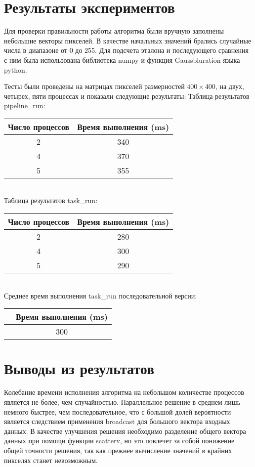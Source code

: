 \documentclass[a4paper,14pt]{report}
\begin{document}
\section{Результаты экспериментов}
Для проверки правильности работы алгоритма были вручную заполнены небольшие векторы пикселей. В качестве начальных значений брались случайные числа в диапазоне от 0 до 255. Для подсчета эталона и последующего сравнения с ним была использована библиотека numpy и функция Gaussbluration языка python. 

Тесты были проведены на матрицах пикселей размерностей $400 \times 400$, на двух, четырех, пяти процессах и показали следующие результаты:
Таблица результатов pipeline\_run:\\[0,5cm]
\begin{tabular}{|c|c|}
    \hline
    Число процессов   & Время выполнения (ms)  \\ \hline
    2               & 340                   \\ \hline
    4                &370                   \\ \hline
    5                &355                      \\ \hline
\end{tabular}\\[1cm]

Таблица результатов task\_run:\\[0,5cm]
\begin{tabular}{|c|c|}
    \hline
    Число процессов   & Время выполнения (ms)  \\ \hline
    2               & 280                   \\ \hline
    4                & 300                \\ \hline
    5                & 290                     \\ \hline
\end{tabular}\\[1cm]

Среднее время выполнения task\_run последовательной версии:\\[0,5cm]
\begin{tabular}{|c|c|}
    \hline
  & Время выполнения (ms)  \\ \hline
  & 300                   \\ \hline
\end{tabular}
\section{Выводы из результатов}
Колебание времени исполнения алгоритма на небольшом количестве процессов является не более, чем случайностью. Параллельное решение в среднем лишь немного быстрее, чем последовательное, что с большой долей вероятности является следствием применения broadcast для большого вектора входных данных. В качестве улучшения решения необходимо разделение общего вектора данных при помощи функции scatterv, но это повлечет за собой понижение общей точности решения, так как прежнее вычисление значений в крайних пикселях станет невозможным. 
\end{document}
